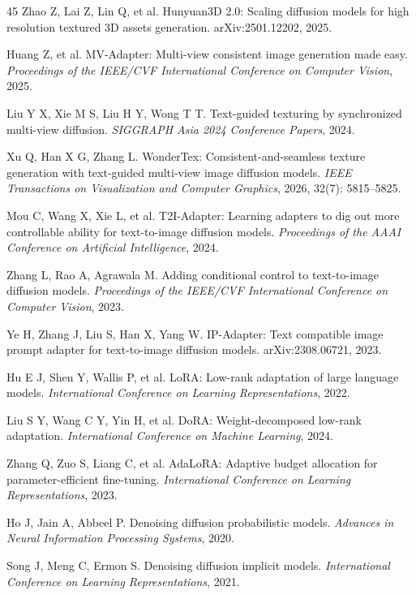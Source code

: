 \documentclass[times,twocolumn,final]{elsarticle}
\begin{document}
\begin{thebibliography}{45}
Zhao Z, Lai Z, Lin Q, et al. Hunyuan3D 2.0: Scaling diffusion models for high resolution textured 3D assets generation. arXiv:2501.12202, 2025.

Huang Z, et al. MV-Adapter: Multi-view consistent image generation made easy. \textit{Proceedings of the IEEE/CVF International Conference on Computer Vision}, 2025.

Liu Y X, Xie M S, Liu H Y, Wong T T. Text-guided texturing by synchronized multi-view diffusion. \textit{SIGGRAPH Asia 2024 Conference Papers}, 2024.

Xu Q, Han X G, Zhang L. WonderTex: Consistent-and-seamless texture generation with text-guided multi-view image diffusion models. \textit{IEEE Transactions on Visualization and Computer Graphics}, 2026, 32(7): 5815--5825.

Mou C, Wang X, Xie L, et al. T2I-Adapter: Learning adapters to dig out more controllable ability for text-to-image diffusion models. \textit{Proceedings of the AAAI Conference on Artificial Intelligence}, 2024.

Zhang L, Rao A, Agrawala M. Adding conditional control to text-to-image diffusion models. \textit{Proceedings of the IEEE/CVF International Conference on Computer Vision}, 2023.

Ye H, Zhang J, Liu S, Han X, Yang W. IP-Adapter: Text compatible image prompt adapter for text-to-image diffusion models. arXiv:2308.06721, 2023.

Hu E J, Shen Y, Wallis P, et al. LoRA: Low-rank adaptation of large language models. \textit{International Conference on Learning Representations}, 2022.

Liu S Y, Wang C Y, Yin H, et al. DoRA: Weight-decomposed low-rank adaptation. \textit{International Conference on Machine Learning}, 2024.

Zhang Q, Zuo S, Liang C, et al. AdaLoRA: Adaptive budget allocation for parameter-efficient fine-tuning. \textit{International Conference on Learning Representations}, 2023.

Ho J, Jain A, Abbeel P. Denoising diffusion probabilistic models. \textit{Advances in Neural Information Processing Systems}, 2020.

Song J, Meng C, Ermon S. Denoising diffusion implicit models. \textit{International Conference on Learning Representations}, 2021.


\end{thebibliography}
\end{document}
